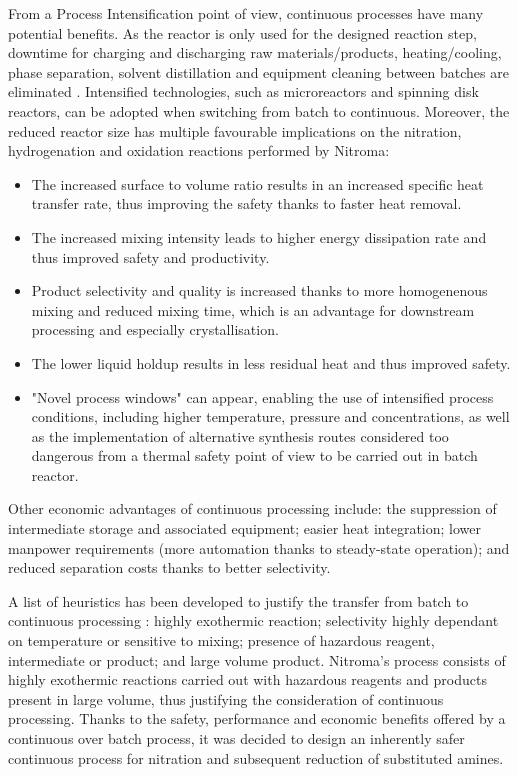 From a Process Intensification point of view, continuous processes have many potential benefits. As the  reactor is only used for the designed reaction step, downtime for charging and discharging raw materials/products, heating/cooling, phase separation, solvent distillation and equipment cleaning between batches are eliminated \cite{randall_process_2020}. Intensified technologies, such as microreactors and spinning disk reactors, can be adopted when switching from batch to continuous. Moreover, the reduced reactor size has multiple favourable implications on the nitration, hydrogenation and oxidation reactions performed by Nitroma:
\begin{itemize}
    \item The increased surface to volume ratio results in an increased specific heat transfer rate, thus improving the safety thanks to faster heat removal.
    \item The increased mixing intensity leads to higher energy dissipation rate and thus improved safety and productivity.
    \item Product selectivity and quality is increased thanks to more homogenenous mixing and reduced mixing time, which is an advantage for downstream processing and especially crystallisation.
    \item The lower liquid holdup results in less residual heat and thus improved safety.
    \item "Novel process windows" can appear, enabling the use of intensified process conditions, including higher temperature, pressure and concentrations, as well as the implementation of alternative synthesis routes considered too dangerous from  a thermal safety point of view to be carried out in batch reactor.
\end{itemize}
Other economic advantages of continuous processing include: the suppression of intermediate storage and associated equipment; easier heat integration; lower manpower requirements (more automation thanks to steady-state operation); and reduced separation costs thanks to better selectivity.

A list of heuristics has been developed to justify the transfer from batch to continuous processing \cite{randall_process_2020}: highly exothermic reaction; selectivity highly dependant on temperature or sensitive to mixing; presence of hazardous reagent, intermediate or product; and large volume product.
Nitroma's process consists of highly exothermic reactions carried out with hazardous reagents and products present in large volume, thus justifying the consideration of continuous processing. Thanks to the safety, performance and economic benefits offered by a continuous over batch process, it was decided to design an inherently safer continuous process for nitration and subsequent reduction of substituted amines.

